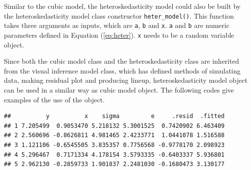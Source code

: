 \documentclass{monashthesis}
\theoremstyle{definition}
\theoremstyle{definition}
\theoremstyle{definition}
\theoremstyle{definition}
\theoremstyle{remark}
\begin{document}
Similar to the cubic model, the heteroskedasticity model could also be built by the heteroskedasticity model class constructor \texttt{heter\_model()}. This function takes three arguments as inputs, which are \texttt{a}, \texttt{b} and \texttt{x}. \texttt{a} and \texttt{b} are numeric parameters defined in Equation (\ref{eq:heter}). \texttt{x} needs to be a random variable object.

\begin{Shaded}
\begin{Highlighting}[]
\OtherTok{\textless{}{-}} \NormalTok{(} \NormalTok{, } \NormalTok{, } \NormalTok{(}\SpecialCharTok{{-}}\NormalTok{, }\NormalTok{))}
\end{Highlighting}
\end{Shaded}

Since both the cubic model class and the heteroskedasticity class are inherited from the visual inference model class, which has defined methods of simulating data, making residual plot and producing lineup, heteroskedasticity model object can be used in a similar way as cubic model object. The following codes give examples of the use of the object.

\begin{Shaded}
\begin{Highlighting}[]
\SpecialCharTok{$}\NormalTok{(}\NormalTok{, } \NormalTok{)}
\end{Highlighting}
\end{Shaded}

\begin{verbatim}
##          y          x    sigma         e     .resid  .fitted
## 1 7.205499  0.9053470 5.218132 5.3001525  0.7420902 6.463409
## 2 2.560696 -0.8626811 4.981465 2.4233771  1.0441078 1.516588
## 3 1.121106 -0.6545505 3.835357 0.7756568 -0.9778170 2.098923
## 4 5.296467  0.7171334 4.178154 3.5793335 -0.6403337 5.936801
## 5 2.962130 -0.2859733 1.901837 2.2481030 -0.1680473 3.130177
\end{verbatim}

\begin{Shaded}
\begin{Highlighting}[]
\SpecialCharTok{$}\SpecialCharTok{$}\NormalTok{(}\NormalTok{, } \NormalTok{), } \NormalTok{)}
\end{Highlighting}
\end{Shaded}
\end{document}
